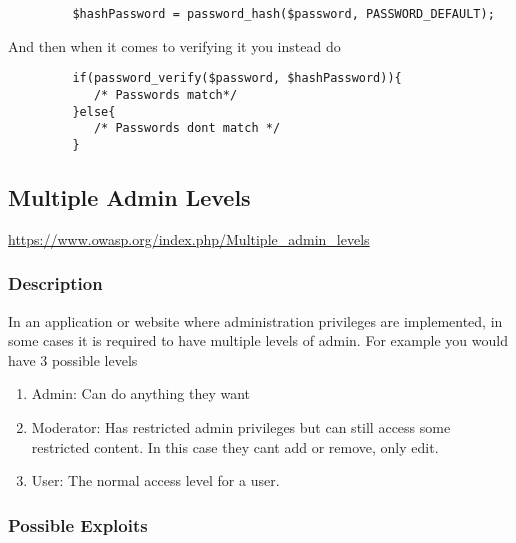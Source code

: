 \documentclass[titlepage]{article}
\begin{document}
      \begin{lstlisting}
         $hashPassword = password_hash($password, PASSWORD_DEFAULT);
      \end{lstlisting}

      And then when it comes to verifying it you instead do

      \begin{lstlisting}
         if(password_verify($password, $hashPassword)){
            /* Passwords match*/
         }else{
            /* Passwords dont match */
         }
      \end{lstlisting}




   \subsection{Multiple Admin Levels} %
   \label{sub:multiple_admin_levels}

      \url{https://www.owasp.org/index.php/Multiple_admin_levels}
   
      \subsubsection{Description} %
      \label{ssub:multiple_admin_levels_description}
      
      In an application or website where administration privileges are implemented, in some cases it is required to have multiple levels of admin. For example you would have 3 possible levels

      \begin{enumerate}
         \item Admin: Can do anything they want
         \item Moderator: Has restricted admin privileges but can still access some restricted content. In this case they cant add or remove, only edit.
         \item User: The normal access level for a user.
      \end{enumerate}



      \subsubsection{Possible Exploits} %
      \label{ssub:multiple_admin_levels_possible_exploits}
      
\end{document}
